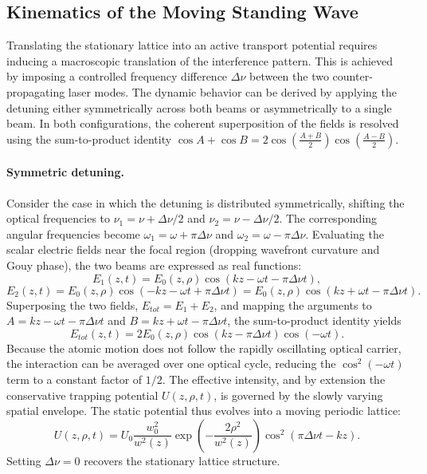 \subsection{Kinematics of the Moving Standing Wave}

Translating the stationary lattice into an active transport potential requires inducing a macroscopic translation of the interference pattern. This is achieved by imposing a controlled frequency difference $\Delta\nu$ between the two counter-propagating laser modes. The dynamic behavior can be derived by applying the detuning either symmetrically across both beams or asymmetrically to a single beam. In both configurations, the coherent superposition of the fields is resolved using the sum-to-product identity $\cos A + \cos B = 2\cos\!\left(\tfrac{A+B}{2}\right)\cos\!\left(\tfrac{A-B}{2}\right)$.

\paragraph{Symmetric detuning.}
Consider the case in which the detuning is distributed symmetrically, shifting the optical frequencies to $\nu_1 = \nu + \Delta\nu/2$ and $\nu_2 = \nu - \Delta\nu/2$. The corresponding angular frequencies become $\omega_1 = \omega + \pi\Delta\nu$ and $\omega_2 = \omega - \pi\Delta\nu$. Evaluating the scalar electric fields near the focal region (dropping wavefront curvature and Gouy phase), the two beams are expressed as real functions:
\begin{equation}
E_1(z,t) = E_0(z,\rho) \cos(kz - \omega t - \pi\Delta\nu t),
\end{equation}
\begin{equation}
E_2(z,t) = E_0(z,\rho) \cos(-kz - \omega t + \pi\Delta\nu t) = E_0(z,\rho) \cos(kz + \omega t - \pi\Delta\nu t).
\end{equation}
Superposing the two fields, $E_{tot} = E_1 + E_2$, and mapping the arguments to $A = kz - \omega t - \pi\Delta\nu t$ and $B = kz + \omega t - \pi\Delta\nu t$, the sum-to-product identity yields
\begin{equation}
E_{tot}(z,t) = 2E_0(z,\rho) \cos\left(kz - \pi\Delta\nu t\right) \cos(-\omega t).
\end{equation}
Because the atomic motion does not follow the rapidly oscillating optical carrier, the interaction can be averaged over one optical cycle, reducing the $\cos^2(-\omega t)$ term to a constant factor of $1/2$. The effective intensity, and by extension the conservative trapping potential $U(z,\rho,t)$, is governed by the slowly varying spatial envelope. The static potential thus evolves into a moving periodic lattice:
\begin{equation}
U(z,\rho,t) = U_0 \frac{w_0^2}{w^2(z)} \exp\left(-\frac{2\rho^2}{w^2(z)}\right) \cos^2(\pi \Delta\nu t - kz).
\label{eq:moving_potential_sym}
\end{equation}
Setting $\Delta\nu=0$ recovers the stationary lattice structure.

